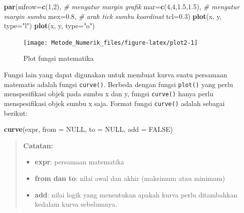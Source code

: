 \documentclass[]{book}
\newenvironment{Shaded}{\begin{snugshade}}{\end{snugshade}}
\newcommand{\CommentTok}[1]{\textcolor[rgb]{0.56,0.35,0.01}{\textit{#1}}}
\newcommand{\DataTypeTok}[1]{\textcolor[rgb]{0.13,0.29,0.53}{#1}}
\newcommand{\DecValTok}[1]{\textcolor[rgb]{0.00,0.00,0.81}{#1}}
\newcommand{\FloatTok}[1]{\textcolor[rgb]{0.00,0.00,0.81}{#1}}
\newcommand{\KeywordTok}[1]{\textcolor[rgb]{0.13,0.29,0.53}{\textbf{#1}}}
\newcommand{\NormalTok}[1]{#1}
\newcommand{\OtherTok}[1]{\textcolor[rgb]{0.56,0.35,0.01}{#1}}
\newcommand{\StringTok}[1]{\textcolor[rgb]{0.31,0.60,0.02}{#1}}
\providecommand{\tightlist}{%
  \setlength{\itemsep}{0pt}\setlength{\parskip}{0pt}}
\theoremstyle{definition}
\theoremstyle{definition}
\theoremstyle{definition}
\theoremstyle{remark}
\begin{document}
\begin{Shaded}
\begin{Highlighting}[]
\KeywordTok{par}\NormalTok{(}\DataTypeTok{mfrow=}\KeywordTok{c}\NormalTok{(}\DecValTok{1}\NormalTok{,}\DecValTok{2}\NormalTok{),}
    \CommentTok{# mengatur margin grafik}
    \DataTypeTok{mar=}\KeywordTok{c}\NormalTok{(}\DecValTok{4}\NormalTok{,}\DecValTok{4}\NormalTok{,}\FloatTok{1.5}\NormalTok{,}\FloatTok{1.5}\NormalTok{),}
    \CommentTok{# mengatur margin sumbu}
    \DataTypeTok{mex=}\FloatTok{0.8}\NormalTok{,}
    \CommentTok{# arah tick sumbu koordinat}
    \DataTypeTok{tcl=}\FloatTok{0.3}\NormalTok{)}
\KeywordTok{plot}\NormalTok{(x, y, }\DataTypeTok{type=}\StringTok{"l"}\NormalTok{)}
\KeywordTok{plot}\NormalTok{(x, y, }\DataTypeTok{type=}\StringTok{"o"}\NormalTok{)}
\end{Highlighting}
\end{Shaded}

\begin{figure}

{\centering \texttt{[image: Metode\_Numerik\_files/figure-latex/plot2-1]} 

}

\caption{Plot fungsi matematika}\label{fig:plot2}
\end{figure}

Fungsi lain yang dapat digunakan untuk membuat kurva suatu persamaan matematis adalah fungsi \texttt{curve()}. Berbeda dengan fungsi \texttt{plot()} yang perlu menspesifikasi objek pada sumbu x dan y, fungsi \texttt{curve()} hanya perlu menspesifikasi objek sumbu x saja. Format fungsi \texttt{curve()} adalah sebagai berikut:

\begin{Shaded}
\begin{Highlighting}[]
\KeywordTok{curve}\NormalTok{(expr, }\DataTypeTok{from =} \OtherTok{NULL}\NormalTok{, }\DataTypeTok{to =} \OtherTok{NULL}\NormalTok{, }\DataTypeTok{add =} \OtherTok{FALSE}\NormalTok{)}
\end{Highlighting}
\end{Shaded}

\begin{quote}
\textbf{Catatan:}

\begin{itemize}
\tightlist
\item
  \textbf{expr}: persamaan matematika
\item
  \textbf{from dan to}: nilai awal dan akhir (maksimum atau minimum)
\item
  \textbf{add}: nilai logik yang menentukan apakah kurva perlu ditambahkan kedalam kurva sebelumnya.
\end{itemize}
\end{quote}
\end{document}
